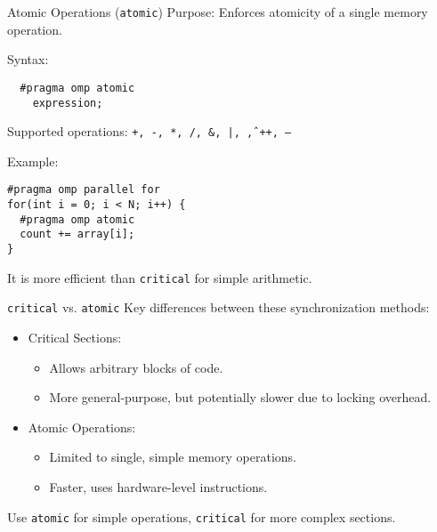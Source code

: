 \documentclass{beamer}
\begin{document}
\begin{frame}[fragile]{Atomic Operations (\texttt{atomic})}
  Purpose:
  Enforces atomicity of a single memory operation.

  Syntax:
  \begin{verbatim}
  #pragma omp atomic
    expression;
  \end{verbatim}

  Supported operations: \texttt{+, -, *, /, \&, |, \^, ++, --}

  Example:
  \lstset{style=CStyle}
  \begin{lstlisting}
#pragma omp parallel for
for(int i = 0; i < N; i++) {
  #pragma omp atomic
  count += array[i];
}
  \end{lstlisting}

  It is more efficient than \texttt{critical} for simple arithmetic.
\end{frame}

\begin{frame}{\texttt{critical} vs. \texttt{atomic}}
  Key differences between these synchronization methods:

  \begin{itemize}
    \item Critical Sections:
    \begin{itemize}
      \item Allows arbitrary blocks of code.
      \item More general-purpose, but potentially slower due to locking overhead.
    \end{itemize}

    \item Atomic Operations:
    \begin{itemize}
      \item Limited to single, simple memory operations.
      \item Faster, uses hardware-level instructions.
    \end{itemize}
  \end{itemize}

  Use \texttt{atomic} for simple operations, \texttt{critical} for more complex sections.
\end{frame}
\end{document}
